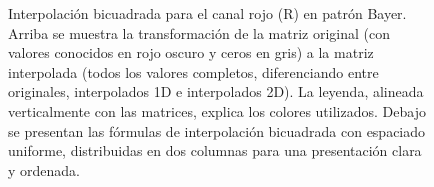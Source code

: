 \begin{figure}[H]
\caption{Interpolación bicuadrada para el canal rojo (R) en patrón Bayer. Arriba se muestra la transformación de la matriz original (con valores conocidos en rojo oscuro y ceros en gris) a la matriz interpolada (todos los valores completos, diferenciando entre originales, interpolados 1D e interpolados 2D). La leyenda, alineada verticalmente con las matrices, explica los colores utilizados. Debajo se presentan las fórmulas de interpolación bicuadrada con espaciado uniforme, distribuidas en dos columnas para una presentación clara y ordenada.}
\label{fig:interpolacion_bicuadrada_R_completa}
\end{figure}

